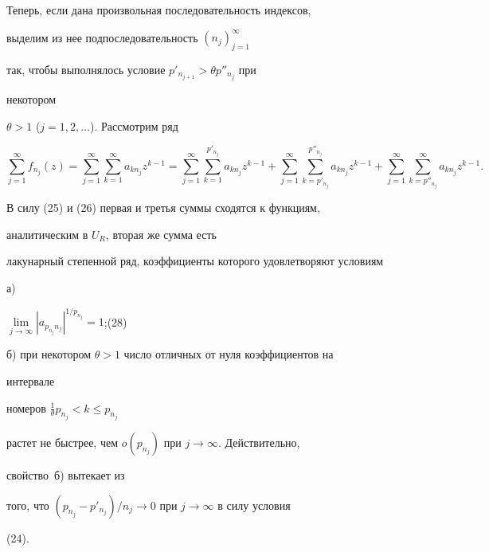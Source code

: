 Теперь, если дана произвольная последовательность индексов, 


выделим из нее подпоследовательность $(n_j)^\infty_{j=1}$ 


так, чтобы выполнялось условие $p'_{n_{j+1}}>\theta p''_{n_j}$ при 


некотором 


$\theta>1$ ($j=1,2,\dotsc$). Рассмотрим ряд 


\begin{equation} 


\sum^\infty_{j=1}f_{n_j}(z)=\sum^\infty_{j=1} 


\sum^\infty_{k=1}a_{kn_j}z^{k-1}= 


\sum^\infty_{j=1}\sum^{p'_{n_j}}_{k=1} 


a_{kn_j}z^{k-1}+\sum^\infty_{j=1} 


\sum^{p''_{n_j}}_{k=p'_{n_j}}a_{kn_j}z^{k-1}+ 


\sum^\infty_{j=1}\sum^\infty_{k=p''_{n_j}}a_{kn_j}z^{k-1}. 


\end{equation} 


В силу (25) и (26) первая и третья суммы сходятся к функциям, 


аналитическим в $U_R$, вторая же сумма есть 


лакунарный степенной ряд, коэффициенты которого удовлетворяют условиям 


\smallskip


 


а) \hfill


$\lim\limits_{j\to\infty}|a_{p_{n_j}n_j}|^{1/p_{n_j}}=1$;\hfill (28)


\addtocounter{equation}{1} 


\smallskip


 


б) при некотором $\theta>1$ число отличных от нуля коэффициентов на 


интервале 


номеров $\frac{1}{\theta}p_{n_j}<k\le p_{n_j}$ 


растет не быстрее, чем $o(p_{n_j})$ при $j\to\infty$. Действительно, 


свойство~б) вытекает из 


того, что $(p_{n_j}-p'_{n_j})/n_j\to0$ при $j\to\infty$ в силу условия 


(24). 



